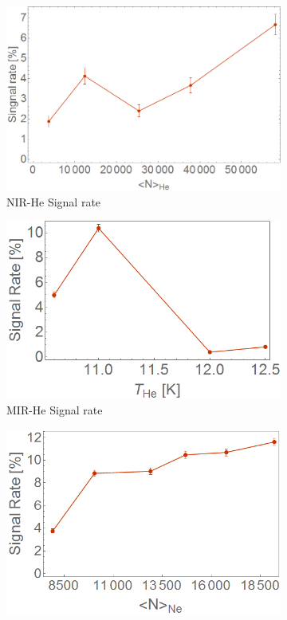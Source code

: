 \begin{figure}[h!]
\begin{subfigure}[l]{0.32\textwidth}
\includegraphics[width=1\textwidth]{../Images/results/NI_He_Dropletsize/signalrate.png} \caption{NIR-He Signal rate} \end{subfigure}
\begin{subfigure}[l]{0.32\textwidth}
\includegraphics[width=1\textwidth]{../Images/results/Mir_He_Dropletsize/sigrate.png}
\caption{MIR-He Signal rate} \end{subfigure}
\begin{subfigure}[l]{0.32\textwidth}
\includegraphics[width=1\textwidth]{../Images/results/MIR_Ne_DropletSize/Sigrate.png}

\end{subfigure}
\end{figure}
